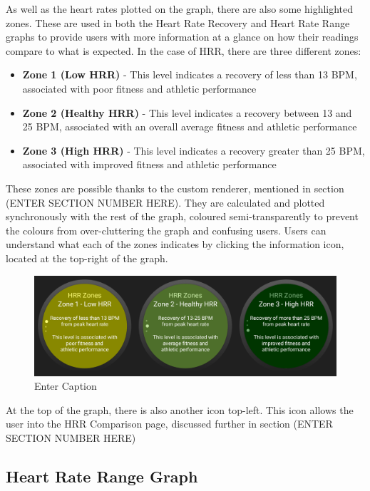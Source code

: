 \documentclass{l4proj}
\begin{document}
As well as the heart rates plotted on the graph, there are also some highlighted zones. These are used in both the Heart Rate Recovery and Heart Rate Range graphs to provide users with more information at a glance on how their readings compare to what is expected. In the case of HRR, there are three different zones:

\begin{itemize}
    \item \textbf{Zone 1 (Low HRR)} - This level indicates a recovery of less than 13 BPM, associated with poor fitness and athletic performance
    \item \textbf{Zone 2 (Healthy HRR)} - This level indicates a recovery between 13 and 25 BPM, associated with an overall average fitness and athletic performance
    \item \textbf{Zone 3 (High HRR)} - This level indicates a recovery greater than 25 BPM, associated with improved fitness and athletic performance
\end{itemize}

These zones are possible thanks to the custom renderer, mentioned in section (ENTER SECTION NUMBER HERE). They are calculated and plotted synchronously with the rest of the graph, coloured semi-transparently to prevent the colours from over-cluttering the graph and confusing users. Users can understand what each of the zones indicates by clicking the information icon, located at the top-right of the graph.

\begin{figure}[h!]
    \centering
    \includegraphics[width=1\linewidth]{dissertation//dissImages/CombinedHRRZones.png}
    \caption{Enter Caption}
    \label{fig:enter-label}
\end{figure}

At the top of the graph, there is also another icon top-left. This icon allows the user into the HRR Comparison page, discussed further in section (ENTER SECTION NUMBER HERE)

\subsection{Heart Rate Range Graph}
\end{document}
